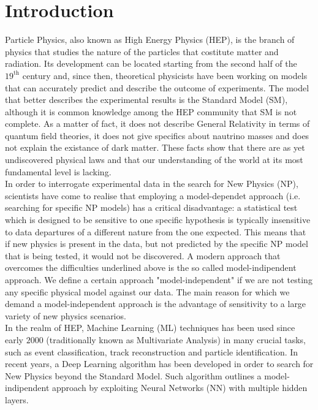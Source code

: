 \chapter{Introduction}
\label{chap:Introduction}


Particle Physics, also known as High Energy Physics (HEP), is the branch of physics that studies the nature of the
particles that costitute matter and radiation. Its development can be located starting from the second half of the
$19^{\text{th}}$ century and, since then, theoretical physicists have been working on models that can accurately predict
and describe the outcome of experiments. The model that better describes the experimental results is the Standard Model
(SM), although it is common knowledge among the HEP community that SM is not complete. As a matter of fact, it does not
describe General Relativity in terms of quantum field theories, it does not give specifics about nautrino masses and
does not explain the existance of dark matter. These facts show that there are as yet undiscovered physical laws and
that our understanding of the world at its most fundamental level is lacking.\\

In order to interrogate experimental data in the search for New Physics (NP), scientists have come to realise that
employing a model-dependet approach (i.e. searching for specific NP models) has a critical disadvantage: a statistical
test which is designed to be sensitive to one specific hypothesis is typically insensitive to data departures of a
different nature from the one expected. This means that if new physics is present in the data, but not predicted by the
specific NP model that is being tested, it would not be discovered. A modern approach that overcomes the difficulties
underlined above is the so called model-indipendent approach. We define a certain approach "model-independent" if we are
not testing any specific physical model against our data. The main reason for which we demand a model-independent
approach is the advantage of sensitivity to a large variety of new physics scenarios.\\

In the realm of HEP, Machine Learning (ML) techniques has been used since early $2000$ (traditionally known as
Multivariate Analysis) in many crucial tasks, such as event classification, track reconstruction and particle
identification. In recent years, a Deep Learning algorithm has been developed in order to search for New Physics beyond
the Standard Model. Such algorithm outlines a model-indipendent approach by exploiting Neural Networks (NN) with multiple
hidden layers.\\

